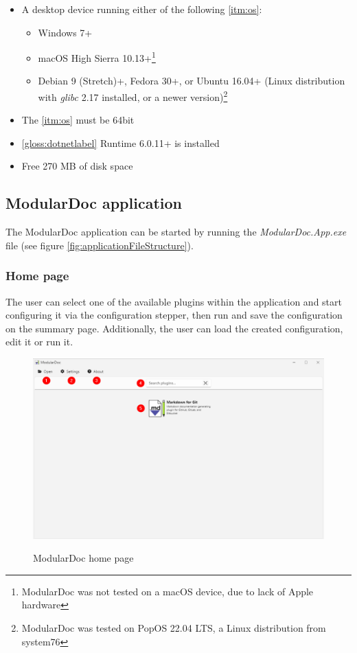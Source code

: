 \begin{itemize}
    \item A desktop device running either of the following \ref{itm:os}:
    \begin{itemize}
        \item Windows 7+
        \item macOS High Sierra 10.13+\footnote{ModularDoc was not tested on a macOS device, due to lack of Apple hardware}
        \item  Debian 9 (Stretch)+, Fedora 30+, or Ubuntu 16.04+ (Linux distribution with \textit{glibc} 2.17 installed, or a newer version)\footnote{ModularDoc was tested on PopOS 22.04 LTS, a Linux distribution from system76}
    \end{itemize}
    \item The \ref{itm:os} must be 64bit
    \item \ref{gloss:dotnetlabel} Runtime 6.0.11+ is installed
    \item Free 270 MB of disk space
\end{itemize}

\subsection{ModularDoc application}

The ModularDoc application can be started by running the \textit{ModularDoc.App.exe} file (see figure \ref{fig:applicationFileStructure}).

\subsubsection{Home page}

The user can select one of the available plugins within the application and start configuring it via the configuration stepper, then run and save the configuration on the summary page.
Additionally, the user can load the created configuration, edit it or run it.

\begin{figure}[H]
    \includegraphics[width=\linewidth]{img/modularDocHomePage.png}
    \label{fig:modularDocHome}
    \caption{ModularDoc home page}
\end{figure}

